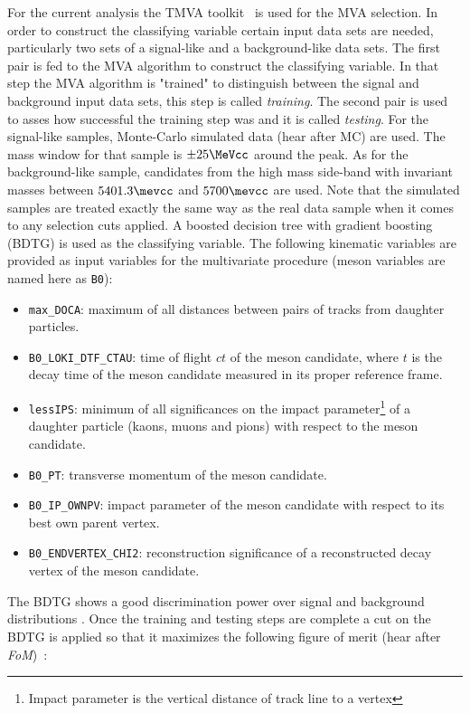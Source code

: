 For the current analysis the TMVA toolkit~\cite{TMVA} is used for the MVA selection. In order to construct the classifying variable certain 
input data sets are needed, particularly two sets of a signal-like and a background-like data sets. The first pair is fed to the MVA algorithm 
to construct the classifying variable. In that step the MVA algorithm is "trained" to distinguish between the signal and background input data sets,
this step is called {\it training}. The second pair is used to asses how successful the training step was and it is called {\it testing}. 
For the signal-like samples, \BsJpsiKst Monte-Carlo simulated data (hear after MC)
are used. The \Bs mass window for that sample is $\pm 25 \MeVcc$ around the \Bs peak. As for the background-like sample, candidates from the high mass side-band
with invariant masses between $5401.3\mevcc$ and $5700\mevcc$ are used. Note that the simulated samples are treated exactly the same way as the
real data sample when it comes to any selection cuts applied. A boosted decision tree with gradient boosting (BDTG) is used as the classifying variable. 
The following kinematic variables are provided as input variables for the multivariate procedure (\Bs meson variables are 
named here as \texttt{B0}):

\begin{itemize}
\item{} \texttt{max\_DOCA}: maximum of all distances between pairs of tracks from daughter particles.
\item{} \texttt{B0\_LOKI\_DTF\_CTAU}: time of flight $ct$ of the \Bs meson candidate, where
$t$ is the decay time of the \Bs meson candidate measured in its proper reference frame.
\item{} \texttt{lessIPS}: minimum of all significances on the impact 
                          parameter\footnote{Impact parameter is the vertical distance of track line to a vertex}
                          of a daughter particle (kaons, muons and pions) with respect to the \Bs meson candidate.
\item{} \texttt{B0\_PT}: transverse momentum of the \Bs meson candidate.
\item{} \texttt{B0\_IP\_OWNPV}: impact parameter of the \Bs meson candidate with respect to its best own parent vertex.
\item{} \texttt{B0\_ENDVERTEX\_CHI2}: reconstruction significance of a reconstructed decay vertex of the \Bs meson candidate.
\end{itemize}

The BDTG shows a good discrimination power over signal and background distributions .
Once the training and testing steps are complete a cut on the BDTG is applied so that it maximizes the following figure of merit
(hear after {\it FoM})~\cite{Yuehong_fom}:

